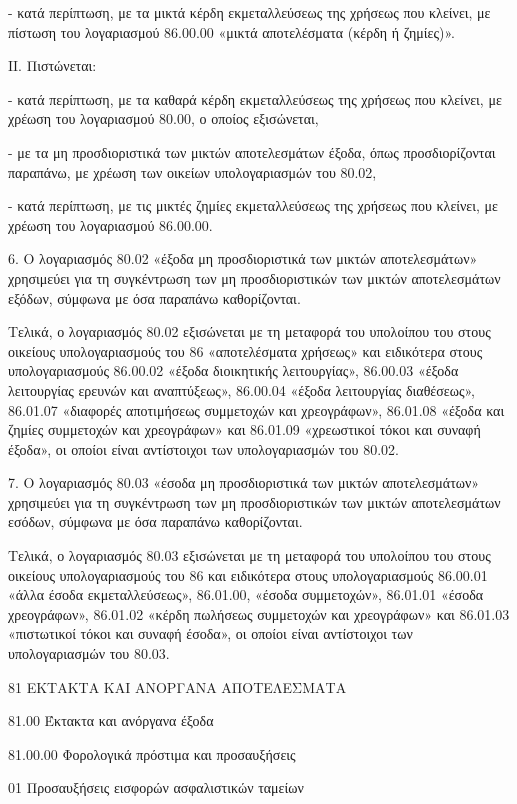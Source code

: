 \documentclass[A4,10pt,greek]{book}
\begin{document}
- κατά περίπτωση, με τα μικτά κέρδη εκμεταλλεύσεως της χρήσεως που κλείνει, με πίστωση του λογαριασμού 86.00.00 «μικτά αποτελέσματα (κέρδη ή ζημίες)».

ΙΙ. Πιστώνεται:

- κατά περίπτωση, με τα καθαρά κέρδη εκμεταλλεύσεως της χρήσεως που κλείνει, με χρέωση του λογαριασμού 80.00, ο οποίος εξισώνεται,

- με τα μη προσδιοριστικά των μικτών αποτελεσμάτων έξοδα, όπως προσδιορίζονται παραπάνω, με χρέωση των οικείων υπολογαριασμών του 80.02,

- κατά περίπτωση, με τις μικτές ζημίες εκμεταλλεύσεως της χρήσεως που κλείνει, με χρέωση του λογαριασμού 86.00.00.

6. Ο λογαριασμός 80.02 «έξοδα μη προσδιοριστικά των μικτών αποτελεσμάτων» χρησιμεύει για τη συγκέντρωση των μη προσδιοριστικών των μικτών αποτελεσμάτων εξόδων, σύμφωνα με όσα παραπάνω καθορίζονται.

Τελικά, ο λογαριασμός 80.02 εξισώνεται με τη μεταφορά του υπολοίπου του στους οικείους υπολογαριασμούς του 86 «αποτελέσματα χρήσεως» και ειδικότερα στους υπολογαριασμούς 86.00.02 «έξοδα διοικητικής λειτουργίας», 86.00.03 «έξοδα λειτουργίας ερευνών και αναπτύξεως», 86.00.04 «έξοδα λειτουργίας διαθέσεως», 86.01.07 «διαφορές αποτιμήσεως συμμετοχών και χρεογράφων», 86.01.08 «έξοδα και ζημίες συμμετοχών και χρεογράφων» και 86.01.09 «χρεωστικοί τόκοι και συναφή έξοδα», οι οποίοι είναι αντίστοιχοι των υπολογαριασμών του 80.02.

7. Ο λογαριασμός 80.03 «έσοδα μη προσδιοριστικά των μικτών αποτελεσμάτων» χρησιμεύει για τη συγκέντρωση των μη προσδιοριστικών των μικτών αποτελεσμάτων εσόδων, σύμφωνα με όσα παραπάνω καθορίζονται.

Τελικά, ο λογαριασμός 80.03 εξισώνεται με τη μεταφορά του υπολοίπου του στους οικείους υπολογαριασμούς του 86 και ειδικότερα στους υπολογαριασμούς 86.00.01 «άλλα έσοδα εκμεταλλεύσεως», 86.01.00, «έσοδα συμμετοχών», 86.01.01 «έσοδα χρεογράφων», 86.01.02 «κέρδη πωλήσεως συμμετοχών και χρεογράφων» και 86.01.03 «πιστωτικοί τόκοι και συναφή έσοδα», οι οποίοι είναι αντίστοιχοι των υπολογαριασμών του 80.03.

81    ΕΚΤΑΚΤΑ ΚΑΙ ΑΝΟΡΓΑΝΑ ΑΠΟΤΕΛΕΣΜΑΤΑ

        81.00    Έκτακτα και ανόργανα έξοδα

                     81.00.00    Φορολογικά πρόστιμα και προσαυξήσεις

                               01    Προσαυξήσεις εισφορών ασφαλιστικών ταμείων
\end{document}
